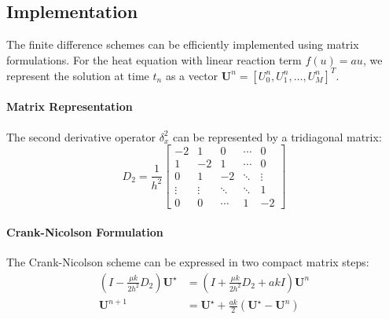 
\subsection{Implementation}

The finite difference schemes can be efficiently implemented using matrix formulations. For the heat equation with linear reaction term $f(u) = au$, we represent the solution at time $t_n$ as a vector $\mathbf{U}^n = [U_0^n, U_1^n, \ldots, U_M^n]^T$.

\paragraph{Matrix Representation}
The second derivative operator $\delta_x^2$ can be represented by a tridiagonal matrix:
\begin{equation}
  D_2 = \frac{1}{h^2}
  \begin{bmatrix}
    -2     & 1      & 0      & \cdots & 0      \\
    1      & -2     & 1      & \cdots & 0      \\
    0      & 1      & -2     & \ddots & \vdots \\
    \vdots & \vdots & \ddots & \ddots & 1      \\
    0      & 0      & \cdots & 1      & -2
  \end{bmatrix}
\end{equation}

\paragraph{Crank-Nicolson Formulation}
The Crank-Nicolson scheme can be expressed in two compact matrix steps:
\begin{align}
  (I - \frac{\mu k}{2h^2}D_2) \mathbf{U}^{\star} & = (I + \frac{\mu k}{2h^2}D_2 + akI) \mathbf{U}^n \tag{Predictor}                       \\
  \mathbf{U}^{n+1}                               & = \mathbf{U}^{\star} + \frac{ak}{2}(\mathbf{U}^{\star} - \mathbf{U}^n) \tag{Corrector}
\end{align}


